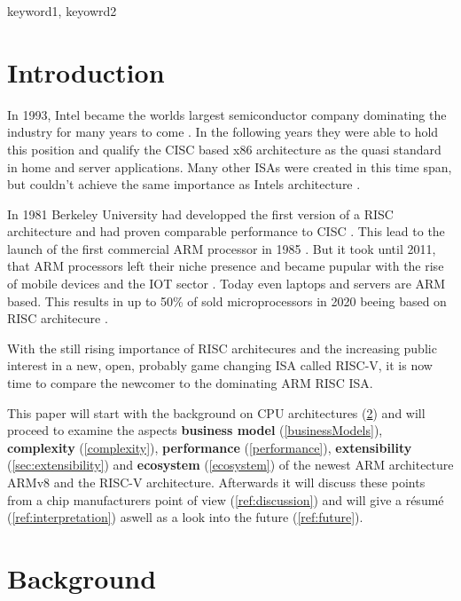 \documentclass[conference]{IEEEtran}
\begin{document}
\begin{IEEEkeywords}
keyword1, keyowrd2
\end{IEEEkeywords}

\section{Introduction}
\label{ref:introduction}
	In 1993, Intel became the worlds largest semiconductor company \cite{ICInsights2011} dominating the industry for many years to come \cite{Blem2013}. In the following years they were able to hold this position and qualify the \gls{CISC} based x86 architecture as the quasi standard in home and server applications. Many other \glspl{ISA} were created in this time span, but couldn't achieve the same importance as Intels architecture \cite[page 3-14]{Waterman2016}. 
	
	In 1981 Berkeley University had developped the first version of a \gls{RISC} architecture and had proven comparable performance to \gls{CISC} \cite[page 2f]{Ryzhyk2006}. This lead to the launch of the first commercial ARM processor in 1985 \cite[page 2f]{Ryzhyk2006}. But it took until 2011, that ARM processors left their niche presence and became pupular with the rise of mobile devices and the IOT sector \cite[Qualcomm representing the rise of ARM silicon]{ICInsights2011a}\cite{ICInsights2012}. Today even laptops \cite{Apple2020} and servers \cite{ARMN1} are ARM based. This results in up to 50\% of sold microprocessors in 2020 beeing based on RISC architecure \cite{ICInsights2020}.

	With the still rising importance of \gls{RISC} architecures and the increasing public interest in a new, open, probably game changing \gls{ISA} called RISC-V, it is now  time to compare the newcomer to the dominating ARM \gls{RISC} \gls{ISA}.

	This paper will start with the background on \gls{CPU} architectures (\ref{ref:background}) and will proceed to examine the aspects \textbf{business model} (\ref{businessModels}), \textbf{complexity} (\ref{complexity}), \textbf{performance} (\ref{performance}), \textbf{extensibility} (\ref{sec:extensibility}) and \textbf{ecosystem} (\ref{ecosystem}) of the newest ARM architecture ARMv8 and the RISC-V architecture. Afterwards it will discuss these points from a chip manufacturers point of view (\ref{ref:discussion}) and will give a résumé (\ref{ref:interpretation}) aswell as a look into the future (\ref{ref:future}).

\section{Background}
\label{ref:background}
\end{document}
